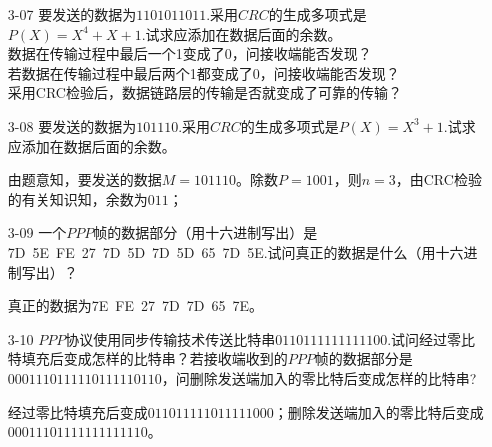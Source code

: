 \documentclass[a4paper,UTF8]{article}
\begin{document}
\courseheader
{}

\begin{enumerate}

\setlength{\itemsep}{3\parskip}

\item[3-07] 要发送的数据为$1101011011$.采用$CRC$的生成多项式是$P(X) = X^4 + X + 1$.试求应添加在数据后面的余数。\\
数据在传输过程中最后一个1变成了0，问接收端能否发现？\\
若数据在传输过程中最后两个1都变成了0，问接收端能否发现？\\
采用CRC检验后，数据链路层的传输是否就变成了可靠的传输？

\item[3-08] 要发送的数据为$101110$.采用$CRC$的生成多项式是$P(X) = X^3 + 1$.试求应添加在数据后面的余数。
\begin{solution}
    由题意知，要发送的数据$M=101110$。除数$P=1001$，则$n=3$，由CRC检验的有关知识知，余数为$011$；
\end{solution}

\item[3-09]  一个$PPP$帧的数据部分（用十六进制写出）是7D\ 5E\ FE\ 27\ 7D\ 5D\ 7D\ 5D\ 65\ 7D\ 5E.试问真正的数据是什么（用十六进制写出）？
\begin{solution}
    真正的数据为7E\ FE\ 27\ 7D\ 7D\ 65\ 7E。
\end{solution}

\item[3-10] $PPP$协议使用同步传输技术传送比特串$0110111111111100$.试问经过零比特填充后变成怎样的比特串？若接收端收到的$PPP$帧的数据部分是$0001110111110111110110$，问删除发送端加入的零比特后变成怎样的比特串?
\begin{solution}
    经过零比特填充后变成$011011111011111000$；删除发送端加入的零比特后变成$00011101111111111110$。
\end{solution}


\end{enumerate}
\end{document}

